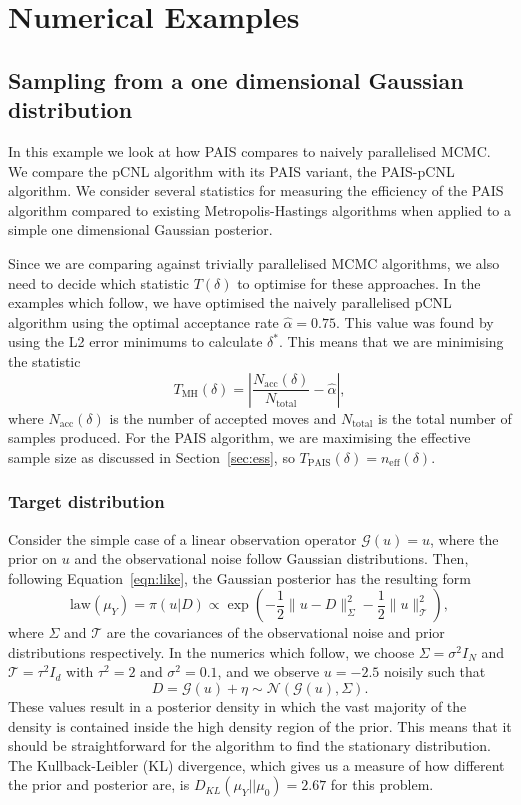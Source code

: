 \documentclass[final]{siamltex}
\newcommand{\G}{\mathcal{G}}
\newcommand{\neff}{n_{\text{eff}}}
\begin{document}
\section{Numerical Examples}\label{Sec:Num}

\subsection{Sampling from a one dimensional Gaussian distribution}\label{sec:problem 1}

In this example we look at how PAIS compares to naively parallelised
MCMC. We compare the pCNL algorithm \cite{cotter2013mcmc} with its
PAIS variant, the PAIS-pCNL algorithm. We consider several statistics
for measuring the efficiency of the PAIS algorithm compared to
existing Metropolis-Hastings algorithms when applied to a simple one
dimensional Gaussian posterior.


Since we are comparing against trivially parallelised MCMC algorithms,
we also need to decide which statistic $T(\delta)$ to optimise for
these approaches. In the examples which follow, we have optimised the naively parallelised pCNL algorithm using the optimal acceptance rate $\hat{\alpha} = 0.75$. This value was found by using the L2 error minimums to calculate $\delta^*$. This means that we are minimising the statistic
\[
	T_{\text{MH}}(\delta) = \left| \frac{N_{\text{acc}}(\delta)}{N_{\text{total}}} - \hat{\alpha} \right|,
\]
where $N_{\text{acc}}(\delta)$ is the number of accepted moves and
$N_{\text{total}}$ is the total number of samples produced. For the
PAIS algorithm, we are maximising the effective sample size as
discussed in Section~\ref{sec:ess}, so $T_{\text{PAIS}}(\delta) =
\neff(\delta)$.

\subsubsection{Target distribution}

Consider the simple case of a linear observation operator $\G(u) = u$, where the prior on $u$ and the observational noise follow Gaussian distributions. Then, following Equation~\ref{eqn:like}, the Gaussian posterior has the resulting form
\begin{equation}\label{eqn:Gaussian posterior}
	\text{law}(\mu_Y) = \pi(u|D) \propto \exp\left(-\frac{1}{2}\big\|u - D\big\|^2_\Sigma - \frac{1}{2}\big\|u\big\|^2_{\mathcal{T}}\right),
\end{equation}
where $\Sigma$ and $\mathcal{T}$ are the covariances of the
observational noise and prior distributions respectively. In the
numerics which follow, we choose $\Sigma = \sigma^2I_N$ and
$\mathcal{T} = \tau^2I_d$ with $\tau^2 =2$ and $\sigma^2 = 0.1$, and
we observe $u=-2.5$ noisily such that
\[
D = \mathcal{G}(u) + \eta \sim \mathcal{N}(\mathcal{G}(u),\Sigma).
\]
These values result in a posterior density in which the vast majority
of the density is contained inside the high density region of the
prior. This means that it should be straightforward for the algorithm
to find the stationary distribution. The Kullback-Leibler (KL)
divergence, which gives us a measure of how different the prior and
posterior are, is $D_{KL}(\mu_Y || \mu_0) = 2.67$ for this problem.
\end{document}
